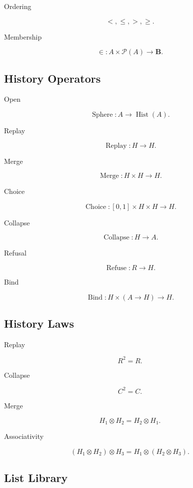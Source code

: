 \documentclass[12pt,oneside]{article}
\theoremstyle{definition}
\theoremstyle{remark}
\begin{document}
Ordering

\[
<
,\le,
>,
\ge.
\]

Membership

\[
\in
:
A
\times
\mathcal P(A)
\rightarrow
\mathbf B.
\]

\subsection*{History Operators}

Open

\[
\operatorname{Sphere}
:
A
\rightarrow
\operatorname{Hist}(A).
\]

Replay

\[
\operatorname{Replay}
:
H
\rightarrow
H.
\]

Merge

\[
\operatorname{Merge}
:
H
\times
H
\rightarrow
H.
\]

Choice

\[
\operatorname{Choice}
:
[0,1]
\times
H
\times
H
\rightarrow
H.
\]

Collapse

\[
\operatorname{Collapse}
:
H
\rightarrow
A.
\]

Refusal

\[
\operatorname{Refuse}
:
R
\rightarrow
H.
\]

Bind

\[
\operatorname{Bind}
:
H
\times
(A\rightarrow H)
\rightarrow
H.
\]

\subsection*{History Laws}

Replay

\[
R^2=R.
\]

Collapse

\[
C^2=C.
\]

Merge

\[
H_1\otimes H_2
=
H_2\otimes H_1.
\]

Associativity

\[
(H_1\otimes H_2)\otimes H_3
=
H_1\otimes(H_2\otimes H_3).
\]

\subsection*{List Library}
\end{document}
